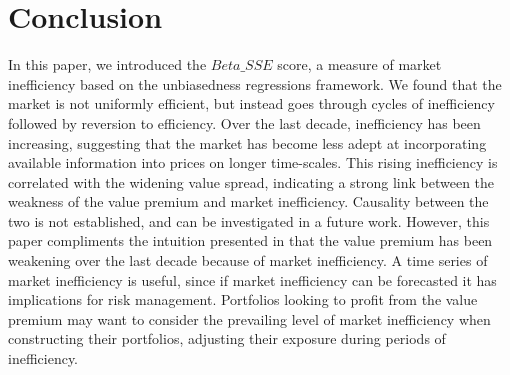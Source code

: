 \section{Conclusion}
\label{sec:conclusion}

In this paper, we introduced the $Beta\_SSE$ score, a measure of market inefficiency based on the unbiasedness regressions framework.
We found that the market is not uniformly efficient, but instead goes through cycles of inefficiency followed by reversion to efficiency.
Over the last decade, inefficiency has been increasing, suggesting that the market has become less adept at incorporating available information into prices on longer time-scales.
This rising inefficiency is correlated with the widening value spread, indicating a strong link between the weakness of the value premium and market inefficiency.
Causality between the two is not established, and can be investigated in a future work. However, this paper compliments the intuition 
presented in \citet{asness_2024} that the value premium has been weakening over the last decade because of market inefficiency.
A time series of market inefficiency is useful, since if market inefficiency can be forecasted it has implications for risk management.
Portfolios looking to profit from the value premium may want to consider the prevailing level of market inefficiency when constructing their portfolios,
adjusting their exposure during periods of inefficiency.
